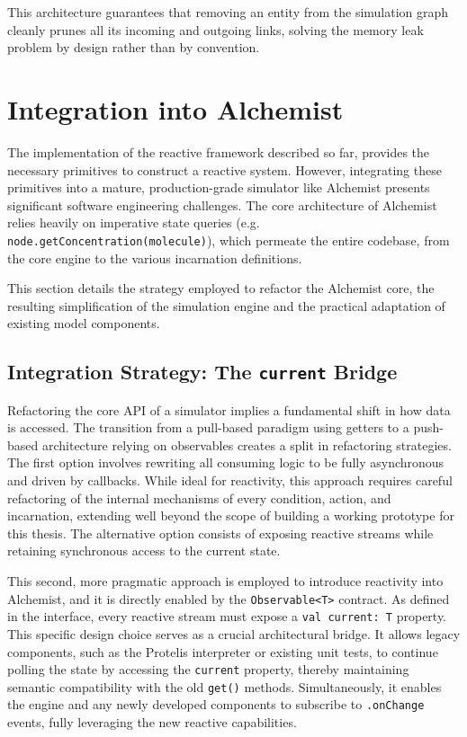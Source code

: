 This architecture guarantees that removing an entity from the simulation graph
cleanly prunes all its incoming and outgoing links, solving the memory leak
problem by design rather than by convention.

\section{Integration into Alchemist}
The implementation of the reactive framework described so far, provides the
necessary primitives to construct a reactive system. However, integrating these
primitives into a mature, production-grade simulator like Alchemist presents
significant software engineering challenges. The core architecture of Alchemist
relies heavily on imperative state queries (e.g.
\texttt{node.getConcentration(molecule)}), which permeate the entire codebase,
from the core engine to the various incarnation definitions.

This section details the strategy employed to refactor the Alchemist core, the
resulting simplification of the simulation engine and the practical adaptation
of existing model components.

\subsection{Integration Strategy: The \texttt{current} Bridge}
Refactoring the core \ac{API} of a simulator implies a fundamental shift in how
data is accessed. The transition from a pull-based paradigm using getters to a
push-based architecture relying on observables creates a split in refactoring
strategies. The first option involves rewriting all consuming logic to be fully
asynchronous and driven by callbacks. While ideal for reactivity, this approach
requires careful refactoring of the internal mechanisms of every condition,
action, and incarnation, extending well beyond the scope of building a working
prototype for this thesis. The alternative option consists of exposing reactive
streams while retaining synchronous access to the current state.

This second, more pragmatic approach is employed to introduce reactivity into
Alchemist, and it is directly enabled by the \texttt{Observable<T>} contract.
As defined in the interface, every reactive stream must expose a \texttt{val
	current: T} property. This specific design choice serves as a crucial
architectural bridge. It allows legacy components, such as the Protelis
interpreter or existing unit tests, to continue polling the state by accessing
the \texttt{current} property, thereby maintaining semantic compatibility with
the old \texttt{get()} methods. Simultaneously, it enables the engine and any
newly developed components to subscribe to \texttt{.onChange} events, fully
leveraging the new reactive capabilities.

